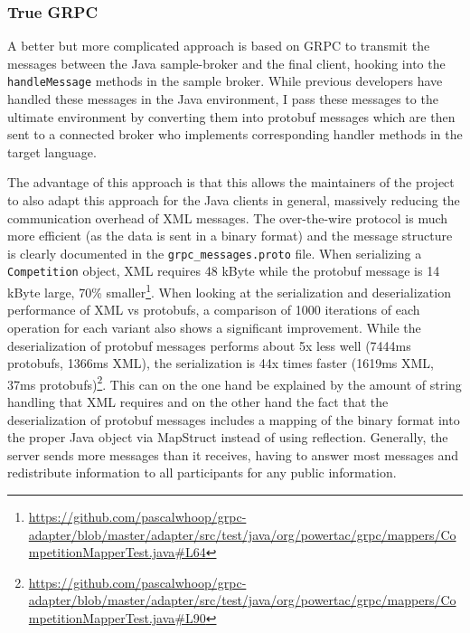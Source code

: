 \subsubsection{True GRPC}%
\label{sub:grpc_based_communication}

A better but more complicated approach is based on \ac{GRPC} to transmit the messages between the Java sample-broker and
the final client, hooking into the \texttt{handleMessage} methods in the sample broker.
While previous developers have handled these messages in the Java environment, I
pass these messages to the ultimate environment by converting them into protobuf messages which are then sent to a
connected broker who implements corresponding handler methods in the target language.

The advantage of this approach is that this allows the maintainers of the project to also adapt this approach for the
Java clients in general, massively reducing the communication overhead of \ac{XML} messages. The over-the-wire protocol
is much more
efficient (as the data is sent in a binary format) and the message structure is clearly documented in the
\texttt{grpc\_messages.proto} file. When serializing a \texttt{Competition} object, \ac{XML} requires 48 kByte while
the protobuf message is 14 kByte large, 70\%
smaller\footnote{\url{https://github.com/pascalwhoop/grpc-adapter/blob/master/adapter/src/test/java/org/powertac/grpc/mappers/CompetitionMapperTest.java\#L64}}.
When looking at the serialization and deserialization performance of \ac{XML} vs protobufs, a comparison of 1000
iterations of each operation for each variant also shows a significant improvement. While the deserialization of
protobuf messages performs about 5x less well (7444ms protobufs, 1366ms \ac{XML}), the serialization is 44x times
faster (1619ms \ac{XML}, 37ms
protobufs)\footnote{\url{https://github.com/pascalwhoop/grpc-adapter/blob/master/adapter/src/test/java/org/powertac/grpc/mappers/CompetitionMapperTest.java\#L90}}.
This can on the one hand be explained by the amount of string handling that \ac{XML} requires and on the other hand the fact that the
deserialization of protobuf messages includes a mapping of the binary format into the proper Java object via MapStruct instead
of using reflection. Generally, the server sends more messages than it receives, having to answer most messages and
redistribute information to all participants for any public information.


